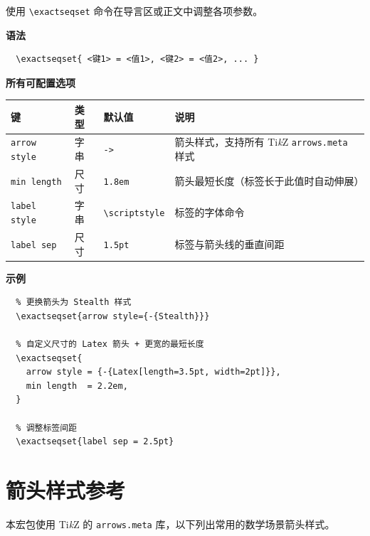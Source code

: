 \documentclass[fontset=fandol]{ctexart}
\newcommand{\opt}[1]{\texttt{#1}}
\newcommand{\cmd}[1]{\texttt{\textbackslash #1}}
\begin{document}
使用 \cmd{exactseqset} 命令在导言区或正文中调整各项参数。

\medskip
\textbf{语法}
\begin{lstlisting}
  \exactseqset{ <键1> = <值1>, <键2> = <值2>, ... }
\end{lstlisting}

\medskip
\textbf{所有可配置选项}

\begin{center}
\begin{tabular}{lllp{6cm}}
  \hline
  键 & 类型 & 默认值 & 说明 \\
  \hline
  \opt{arrow style} & 字串 & \texttt{->} &
    箭头样式，支持所有 Ti\textit{k}Z \texttt{arrows.meta} 样式 \\
  \opt{min length}  & 尺寸 & \texttt{1.8em} &
    箭头最短长度（标签长于此值时自动伸展） \\
  \opt{label style} & 字串 & \texttt{\textbackslash scriptstyle} &
    标签的字体命令 \\
  \opt{label sep}   & 尺寸 & \texttt{1.5pt} &
    标签与箭头线的垂直间距 \\
  \hline
\end{tabular}
\end{center}

\medskip
\textbf{示例}
\begin{lstlisting}
  % 更换箭头为 Stealth 样式
  \exactseqset{arrow style={-{Stealth}}}

  % 自定义尺寸的 Latex 箭头 + 更宽的最短长度
  \exactseqset{
    arrow style = {-{Latex[length=3.5pt, width=2pt]}},
    min length  = 2.2em,
  }

  % 调整标签间距
  \exactseqset{label sep = 2.5pt}
\end{lstlisting}

\section{箭头样式参考}

本宏包使用 Ti\textit{k}Z 的 \texttt{arrows.meta} 库，以下列出常用的数学场景箭头样式。
\end{document}
